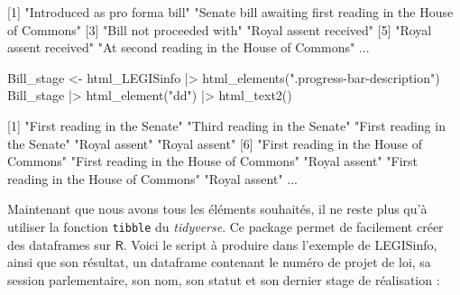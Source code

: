 \documentclass[
  letterpaper,
  DIV=11,
  numbers=noendperiod,
  oneside]{scrreprt}
\newenvironment{Shaded}{\begin{snugshade}}{\end{snugshade}}
\newcommand{\ExtensionTok}[1]{\textcolor[rgb]{0.00,0.23,0.31}{#1}}
\newcommand{\KeywordTok}[1]{\textcolor[rgb]{0.00,0.23,0.31}{#1}}
\newcommand{\NormalTok}[1]{\textcolor[rgb]{0.00,0.23,0.31}{#1}}
\newcommand{\OperatorTok}[1]{\textcolor[rgb]{0.37,0.37,0.37}{#1}}
\newcommand{\StringTok}[1]{\textcolor[rgb]{0.13,0.47,0.30}{#1}}
\begin{document}
\begin{Shaded}
\begin{Highlighting}[]
\ExtensionTok{[1]} \StringTok{"Introduced as pro forma bill"}                                 
\StringTok{"Senate bill awaiting first reading in the House of Commons"}               
 \ExtensionTok{[3]} \StringTok{"Bill not proceeded with"}                                              
 \StringTok{"Royal assent received"}                                                    
 \ExtensionTok{[5]} \StringTok{"Royal assent received"}                                                 
 \StringTok{"At second reading in the House of Commons"}     
\ExtensionTok{...}
\end{Highlighting}
\end{Shaded}

\begin{Shaded}
\begin{Highlighting}[]
\ExtensionTok{Bill\_stage} \OperatorTok{\textless{}}\NormalTok{{-} html\_LEGISinfo }\KeywordTok{|}\OperatorTok{\textgreater{}}\NormalTok{ html\_elements}\KeywordTok{(}\StringTok{".progress{-}bar{-}description"}\KeywordTok{)}
\ExtensionTok{Bill\_stage} \KeywordTok{|}\OperatorTok{\textgreater{}}\NormalTok{ html\_element}\KeywordTok{(}\StringTok{"dd"}\KeywordTok{)} \KeywordTok{|}\OperatorTok{\textgreater{}}\NormalTok{ html\_text2}\KeywordTok{()}
\end{Highlighting}
\end{Shaded}

\begin{Shaded}
\begin{Highlighting}[]
\ExtensionTok{[1]} \StringTok{"First reading in the Senate"}            
\StringTok{"Third reading in the Senate"}            
\StringTok{"First reading in the Senate"}           
\StringTok{"Royal assent"}                        
\StringTok{"Royal assent"}                          
\ExtensionTok{[6]} \StringTok{"First reading in the House of Commons"} 
\StringTok{"First reading in the House of }
\StringTok{Commons"}  \StringTok{"Royal assent"}                          
\StringTok{"First reading in the House of Commons"}  \StringTok{"Royal assent"}        
\ExtensionTok{...}
\end{Highlighting}
\end{Shaded}

Maintenant que nous avons tous les éléments souhaités, il ne reste plus
qu'à utiliser la fonction \texttt{tibble} du \emph{tidyverse}. Ce
package permet de facilement créer des dataframes sur \(\textsf{R}\).
Voici le script à produire dans l'exemple de LEGISinfo, ainsi que son
résultat, un dataframe contenant le numéro de projet de loi, sa session
parlementaire, son nom, son statut et son dernier stage de réalisation :
\end{document}
